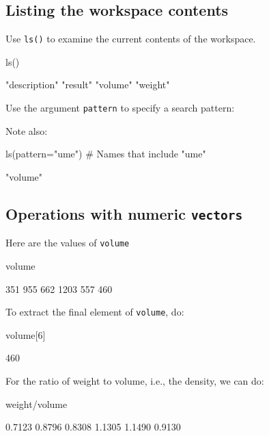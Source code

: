 \documentclass{tufte-book}\usepackage[]{graphicx}\usepackage[]{color}
\newcommand{\txtt}[1]{\texttt{#1}}
\begin{document}
\subsection*{Listing the workspace contents}

Use \txtt{ls()} to examine the current contents
of the workspace.
\begin{Schunk}
\begin{Sinput}
ls()
\end{Sinput}
\begin{Soutput}
[1] "description" "result"      "volume"      "weight"     
\end{Soutput}
\end{Schunk}
Use the argument \txtt{pattern} to specify a search pattern:
\begin{marginfigure}[40pt]
Note also:\\[-5pt]
\begin{Schunk}
\end{Schunk}
\end{marginfigure}
\begin{Schunk}
\begin{Sinput}
ls(pattern="ume")   # Names that include "ume"
\end{Sinput}
\begin{Soutput}
[1] "volume"
\end{Soutput}
\end{Schunk}

\subsection*{Operations with numeric \txtt{vectors}}
Here are the values of \txtt{volume}
\begin{Schunk}
\begin{Sinput}
volume
\end{Sinput}
\begin{Soutput}
[1]  351  955  662 1203  557  460
\end{Soutput}
\end{Schunk}

To extract the final element of \txtt{volume}, do:
\begin{Schunk}
\begin{Sinput}
volume[6]
\end{Sinput}
\begin{Soutput}
[1] 460
\end{Soutput}
\end{Schunk}
For the ratio of weight to volume, i.e., the density, we can do:
\begin{Schunk}
\begin{Sinput}
weight/volume
\end{Sinput}
\begin{Soutput}
[1] 0.7123 0.8796 0.8308 1.1305 1.1490 0.9130
\end{Soutput}
\end{Schunk}
\end{document}
